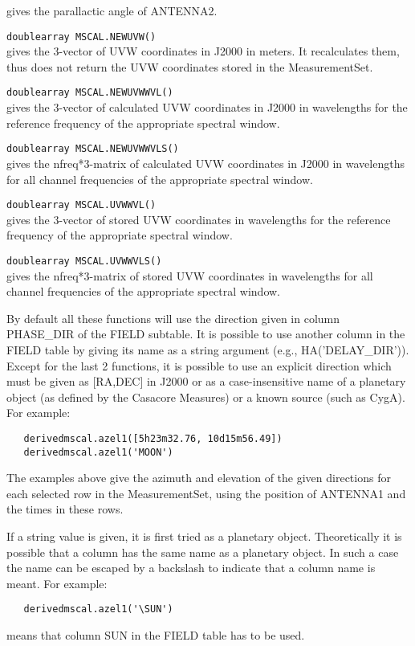 \begin{description}
    gives the parallactic angle of ANTENNA2.
  \item[] \texttt{doublearray MSCAL.NEWUVW()}\\
    gives the 3-vector of UVW coordinates in J2000 in meters. It recalculates
    them, thus does not return the UVW coordinates stored in the MeasurementSet.
  \item[] \texttt{doublearray MSCAL.NEWUVWWVL()}\\
    gives the 3-vector of calculated UVW coordinates in J2000 in wavelengths for
    the reference frequency of the appropriate spectral window.
  \item[] \texttt{doublearray MSCAL.NEWUVWWVLS()}\\
    gives the nfreq*3-matrix of calculated UVW coordinates in J2000 in wavelengths for
    all channel frequencies of the appropriate spectral window.
  \item[] \texttt{doublearray MSCAL.UVWWVL()}\\
    gives the 3-vector of stored UVW coordinates in wavelengths for
    the reference frequency of the appropriate spectral window.
  \item[] \texttt{doublearray MSCAL.UVWWVLS()}\\
    gives the nfreq*3-matrix of stored UVW coordinates in wavelengths for
    all channel frequencies of the appropriate spectral window.
\end{description}
By default all these functions will use the direction given in column PHASE\_DIR
of the FIELD subtable. It is possible to use another column in the
FIELD table by giving
its name as a string argument (e.g., HA('DELAY\_DIR')). 
\\Except for the last 2 functions, it is possible to use an explicit direction which
must be given as [RA,DEC] in J2000 or as a case-insensitive name of a
planetary object (as defined by the Casacore Measures) or a known
source (such as CygA).
For example:
\begin{verbatim}
   derivedmscal.azel1([5h23m32.76, 10d15m56.49])
   derivedmscal.azel1('MOON')
\end{verbatim} 
The examples above give the azimuth and elevation of the given directions for each
selected row in the MeasurementSet, using the position of ANTENNA1 and the
times in these rows. 

If a string value is given, it is first tried as a planetary object.
Theoretically it is possible that a column has the same name as a
planetary object. In such a case the name can be escaped by a backslash
to indicate that a column name is meant.
For example:
\begin{verbatim}
   derivedmscal.azel1('\SUN')
\end{verbatim}
means that column SUN in the FIELD table has to be used.

